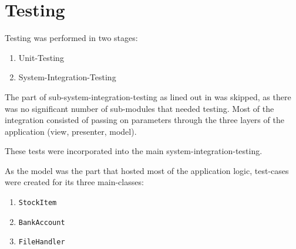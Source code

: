 \chapter{Testing}\label{ch:testing} %

Testing was performed in two stages:

\begin{enumerate}
\item Unit-Testing
\item System-Integration-Testing
\end{enumerate}

The part of sub-system-integration-testing as lined out in \textcite[520]{Sommerville2006} was skipped, as there was no significant number of sub-modules that needed testing. Most of the integration consisted of passing on parameters through the three layers of the application (view, presenter, model).

These tests were incorporated into the main system-integration-testing.

As the model was the part that hosted most of the application logic, test-cases were created for its three main-classes:

\begin{enumerate}
\item \texttt{StockItem}
\item \texttt{BankAccount}
\item \texttt{FileHandler}
\end{enumerate}

